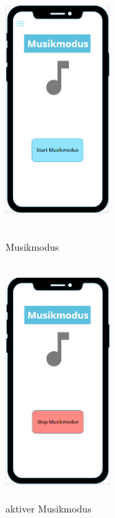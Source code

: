 \documentclass[a4paper,12pt]{article}
\begin{document}
\begin{figure}[ht!]
\begin{minipage}{0.4\textwidth}
			\includegraphics[width=4cm,height=9cm]{./Benutzeroberflaeche/Musikmodus.png}
			\caption{Musikmodus}
		\end{minipage}
		\hfill
		\begin{minipage}{0.4\textwidth}
			\includegraphics[width=4cm,height=9cm]{./Benutzeroberflaeche/Musikmodus_aktiv.png}
			\caption{aktiver Musikmodus}
			
		\end{minipage}
\end{figure}
\end{document}
